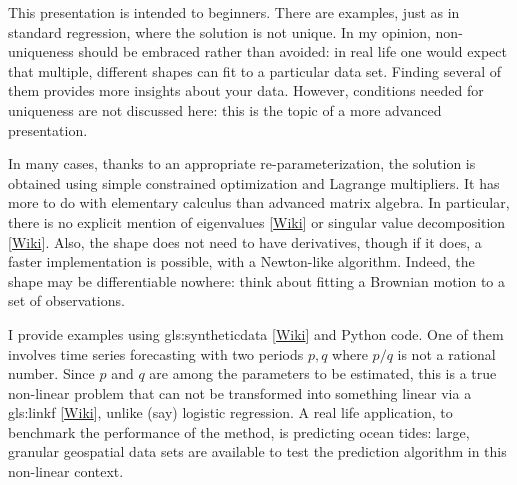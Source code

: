 \documentclass[oneside,10pt]{book}
\begin{document}
This presentation is intended to beginners. There are examples, just as in standard regression, where the solution is not unique. In my opinion, non-uniqueness should be embraced rather than avoided: in real life one would expect that multiple, different shapes can fit to a particular data set. Finding several of them provides more insights about your data. However, conditions needed for uniqueness are not discussed here: this is the topic of a more advanced presentation.

In many cases, thanks to an appropriate re-parameterization, the solution is obtained using simple constrained optimization and Lagrange multipliers. It has more to do with elementary calculus than advanced matrix algebra. In particular,
there is no explicit mention of \textcolor{index}{eigenvalues}
[\href{https://en.wikipedia.org/wiki/Eigenvalues_and_eigenvectors}{Wiki}] or
 \textcolor{index}{singular value decomposition} [\href{https://en.wikipedia.org/wiki/Singular_value_decomposition}{Wiki}]. Also, the shape does not need to have derivatives, though if it does, a faster implementation is possible, with a Newton-like algorithm. Indeed, the shape may be differentiable nowhere: think about fitting a Brownian motion to a set of observations.

I provide examples using \gls{gls:syntheticdata} [\href{https://en.wikipedia.org/wiki/Synthetic_data}{Wiki}] and Python code. One of them involves time series forecasting with two periods $p,q$ where $p/q$ is not a rational number. Since $p$ and $q$ are among the parameters to be estimated, this is a true non-linear problem that can not be transformed into something linear via a
 \gls{gls:linkf} [\href{https://en.wikipedia.org/wiki/Generalized_linear_model#Link_function}{Wiki}], unlike (say) logistic regression.
A real life application, to benchmark the performance of the method, is predicting ocean tides: large, granular geospatial data sets are available to test
 the prediction algorithm in this non-linear context.
\end{document}
